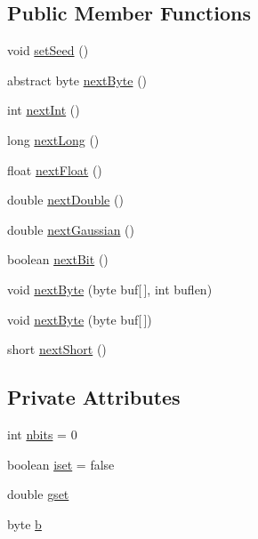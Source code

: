 \subsection*{Public Member Functions}
\begin{DoxyCompactItemize}
\item 
void \hyperlink{classorg_1_1jgap_1_1util_1_1random_x_ab18450263842c7fde69a1d17579714dc}{set\-Seed} ()
\item 
abstract byte \hyperlink{classorg_1_1jgap_1_1util_1_1random_x_a3ef715392cb00b38bba43e5abc5ab845}{next\-Byte} ()
\item 
int \hyperlink{classorg_1_1jgap_1_1util_1_1random_x_a5748a6cb455da130bd937ea5c90a01fa}{next\-Int} ()
\item 
long \hyperlink{classorg_1_1jgap_1_1util_1_1random_x_a9a2981e95cb4e3f9acf59cbbaf383194}{next\-Long} ()
\item 
float \hyperlink{classorg_1_1jgap_1_1util_1_1random_x_a8ce941e4b871d17c36586b89f915c47c}{next\-Float} ()
\item 
double \hyperlink{classorg_1_1jgap_1_1util_1_1random_x_a61463f36f557007b65c688e91a5c5022}{next\-Double} ()
\item 
double \hyperlink{classorg_1_1jgap_1_1util_1_1random_x_aaa39ce24a15f1a77a5e3bd7866e2793e}{next\-Gaussian} ()
\item 
boolean \hyperlink{classorg_1_1jgap_1_1util_1_1random_x_ab8a07cb9d83f3eccca8f58c3a18e02fd}{next\-Bit} ()
\item 
void \hyperlink{classorg_1_1jgap_1_1util_1_1random_x_a2d85f4af5176e48b9463546f85b9f5e5}{next\-Byte} (byte buf\mbox{[}$\,$\mbox{]}, int buflen)
\item 
void \hyperlink{classorg_1_1jgap_1_1util_1_1random_x_a2591a4836fa228447c5f508d6850c56c}{next\-Byte} (byte buf\mbox{[}$\,$\mbox{]})
\item 
short \hyperlink{classorg_1_1jgap_1_1util_1_1random_x_a70085735339aee1eb3be72dd292d29ec}{next\-Short} ()
\end{DoxyCompactItemize}
\subsection*{Private Attributes}
\begin{DoxyCompactItemize}
\item 
int \hyperlink{classorg_1_1jgap_1_1util_1_1random_x_abc44223fc17ec257b1a4514b31ad3211}{nbits} = 0
\item 
boolean \hyperlink{classorg_1_1jgap_1_1util_1_1random_x_af8cac8df13b9e25cb13d505e3d10ed8e}{iset} = false
\item 
double \hyperlink{classorg_1_1jgap_1_1util_1_1random_x_a455672ae37ed072b4f820bfbb0741610}{gset}
\item 
byte \hyperlink{classorg_1_1jgap_1_1util_1_1random_x_a150c6d8d0e49a38277c41352b000ce21}{b}
\end{DoxyCompactItemize}


